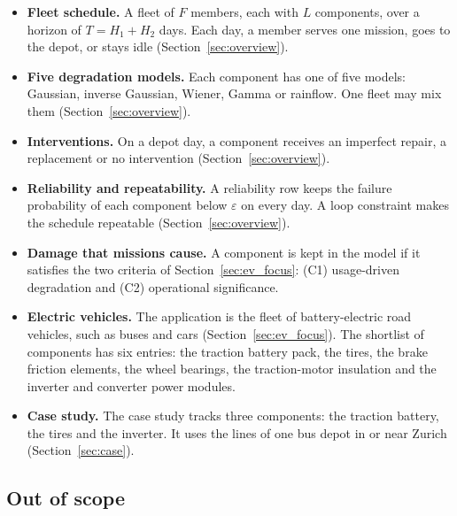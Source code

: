 \documentclass[11pt,a4paper]{article}
\theoremstyle{plain}
\theoremstyle{definition}
\theoremstyle{remark}
\begin{document}
\begin{itemize}
  \item \textbf{Fleet schedule.}
    A fleet of $F$ members, each with $L$ components, over a horizon of $T = H_1 + H_2$ days.
    Each day, a member serves one mission, goes to the depot, or stays idle (Section~\ref{sec:overview}).
  \item \textbf{Five degradation models.}
    Each component has one of five models: Gaussian, inverse Gaussian, Wiener, Gamma or rainflow.
    One fleet may mix them (Section~\ref{sec:overview}).
  \item \textbf{Interventions.}
    On a depot day, a component receives an imperfect repair, a replacement or no intervention (Section~\ref{sec:overview}).
  \item \textbf{Reliability and repeatability.}
    A reliability row keeps the failure probability of each component below $\varepsilon$ on every day.
    A loop constraint makes the schedule repeatable (Section~\ref{sec:overview}).
  \item \textbf{Damage that missions cause.}
    A component is kept in the model if it satisfies the two criteria of Section~\ref{sec:ev_focus}: (C1) usage-driven degradation and (C2) operational significance.
  \item \textbf{Electric vehicles.}
    The application is the fleet of battery-electric road vehicles, such as buses and cars (Section~\ref{sec:ev_focus}).
    The shortlist of components has six entries: the traction battery pack, the tires, the brake friction elements, the wheel bearings, the traction-motor insulation and the inverter and converter power modules.
  \item \textbf{Case study.}
    The case study tracks three components: the traction battery, the tires and the inverter.
    It uses the lines of one bus depot in or near Zurich (Section~\ref{sec:case}).
\end{itemize}

\subsection{Out of scope}
\end{document}
